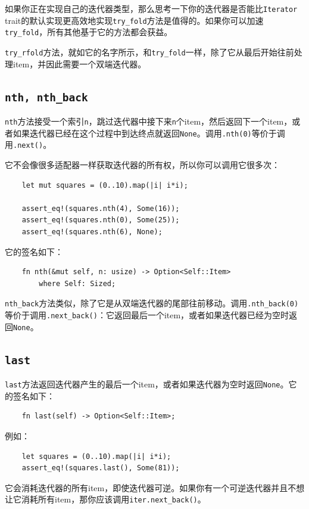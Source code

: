如果你正在实现自己的迭代器类型，那么思考一下你的迭代器是否能比\texttt{Iterator} trait的默认实现更高效地实现\texttt{try\_fold}方法是值得的。如果你可以加速\texttt{try\_fold}，所有其他基于它的方法都会获益。

\texttt{try\_rfold}方法，就如它的名字所示，和\texttt{try\_fold}一样，除了它从最后开始往前处理item，并因此需要一个双端迭代器。

\subsection{\texttt{nth, nth\_back}}
\texttt{nth}方法接受一个索引\texttt{n}，跳过迭代器中接下来\texttt{n}个item，然后返回下一个item，或者如果迭代器已经在这个过程中到达终点就返回\texttt{None}。调用\texttt{.nth(0)}等价于调用\texttt{.next()}。

它不会像很多适配器一样获取迭代器的所有权，所以你可以调用它很多次：
\begin{verbatim}
    let mut squares = (0..10).map(|i| i*i);

    assert_eq!(squares.nth(4), Some(16));
    assert_eq!(squares.nth(0), Some(25));
    assert_eq!(squares.nth(6), None);
\end{verbatim}

它的签名如下：
\begin{verbatim}
    fn nth(&mut self, n: usize) -> Option<Self::Item>
        where Self: Sized;
\end{verbatim}

\texttt{nth\_back}方法类似，除了它是从双端迭代器的尾部往前移动。调用\texttt{.nth\_back(0)}等价于调用\texttt{.next\_back()}：它返回最后一个item，或者如果迭代器已经为空时返回\texttt{None}。

\subsection{\texttt{last}}
\texttt{last}方法返回迭代器产生的最后一个item，或者如果迭代器为空时返回\texttt{None}。它的签名如下：
\begin{verbatim}
    fn last(self) -> Option<Self::Item>;
\end{verbatim}

例如：
\begin{verbatim}
    let squares = (0..10).map(|i| i*i);
    assert_eq!(squares.last(), Some(81));
\end{verbatim}

它会消耗迭代器的所有item，即使迭代器可逆。如果你有一个可逆迭代器并且不想让它消耗所有item，那你应该调用\texttt{iter.next\_back()}。

